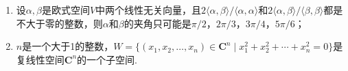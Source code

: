 \begin{enumerate}
\begin{enumerate}
        \item 设$\alpha,\beta$是欧式空间$V$中两个线性无关向量，且${2\langle\alpha,\beta\rangle}/{\langle\alpha,\alpha\rangle}$和${2\langle\alpha,\beta\rangle}/{\langle\beta,\beta\rangle}$都是不大于零的整数，则$\alpha$和$\beta$的夹角只可能是${\pi}/{2}$，${2\pi}/{3}$，${3\pi}/{4}$，${5\pi}/{6}$；

        \item $n$是一个大于1的整数，$W=\{(x_1,x_2,\ldots,x_n)\in\mathbf{C}^n\mid x_1^2+x_2^2+\cdots+x_n^2=0\}$是复线性空间$\mathbf{C}^n$的一个子空间.
    \end{enumerate}
\end{enumerate}

\clearpage
